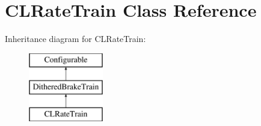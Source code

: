 \hypertarget{class_c_l_rate_train}{
\section{\-C\-L\-Rate\-Train \-Class \-Reference}
\label{class_c_l_rate_train}
}
\-Inheritance diagram for \-C\-L\-Rate\-Train\-:\begin{figure}[H]
\begin{center}
\leavevmode
\includegraphics[height=3.000000cm]{class_c_l_rate_train}
\end{center}
\end{figure}
